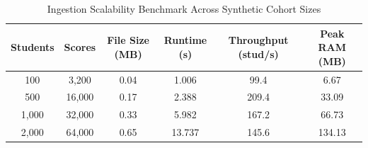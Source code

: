 \begin{table}[h]
\centering
\small
\caption{Ingestion Scalability Benchmark Across Synthetic Cohort Sizes}
\label{tab:scaling}
\begin{tabular}{cccccc}
\toprule
\textbf{Students} & \textbf{Scores} & \textbf{File Size (MB)} & \textbf{Runtime (s)} & \textbf{Throughput (stud/s)} & \textbf{Peak RAM (MB)} \\
\midrule
100 & 3,200 & 0.04 & 1.006 & 99.4 & 6.67 \\
500 & 16,000 & 0.17 & 2.388 & 209.4 & 33.09 \\
1,000 & 32,000 & 0.33 & 5.982 & 167.2 & 66.73 \\
2,000 & 64,000 & 0.65 & 13.737 & 145.6 & 134.13 \\
\bottomrule
\end{tabular}
\end{table}
